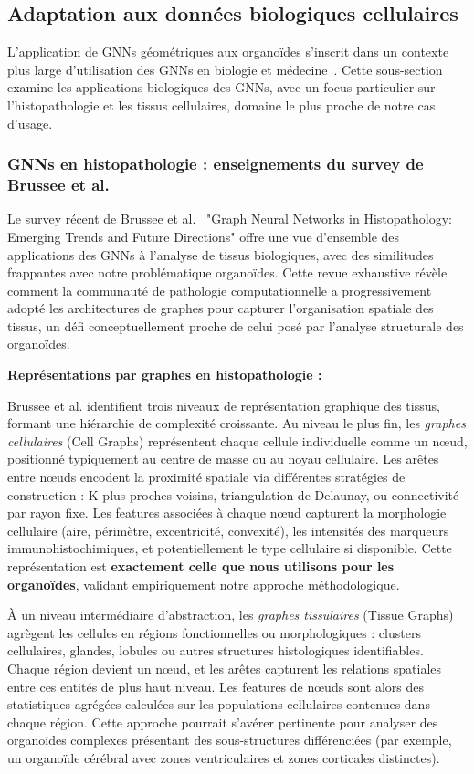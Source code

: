 \subsection{Adaptation aux données biologiques cellulaires}

L'application de GNNs géométriques aux organoïdes s'inscrit dans un contexte plus large d'utilisation des GNNs en biologie et médecine~\cite{Zhang2021GNN,Lecca2023}. Cette sous-section examine les applications biologiques des GNNs, avec un focus particulier sur l'histopathologie et les tissus cellulaires, domaine le plus proche de notre cas d'usage.

\subsubsection{GNNs en histopathologie : enseignements du survey de Brussee et al.}

Le survey récent de Brussee et al.~\cite{Brussee2024} "Graph Neural Networks in Histopathology: Emerging Trends and Future Directions" offre une vue d'ensemble des applications des GNNs à l'analyse de tissus biologiques, avec des similitudes frappantes avec notre problématique organoïdes. Cette revue exhaustive révèle comment la communauté de pathologie computationnelle a progressivement adopté les architectures de graphes pour capturer l'organisation spatiale des tissus, un défi conceptuellement proche de celui posé par l'analyse structurale des organoïdes.

\textbf{Représentations par graphes en histopathologie :}

Brussee et al. identifient trois niveaux de représentation graphique des tissus, formant une hiérarchie de complexité croissante. Au niveau le plus fin, les \textit{graphes cellulaires} (Cell Graphs) représentent chaque cellule individuelle comme un nœud, positionné typiquement au centre de masse ou au noyau cellulaire. Les arêtes entre nœuds encodent la proximité spatiale via différentes stratégies de construction : K plus proches voisins, triangulation de Delaunay, ou connectivité par rayon fixe. Les features associées à chaque nœud capturent la morphologie cellulaire (aire, périmètre, excentricité, convexité), les intensités des marqueurs immunohistochimiques, et potentiellement le type cellulaire si disponible. Cette représentation est \textbf{exactement celle que nous utilisons pour les organoïdes}, validant empiriquement notre approche méthodologique.

À un niveau intermédiaire d'abstraction, les \textit{graphes tissulaires} (Tissue Graphs) agrègent les cellules en régions fonctionnelles ou morphologiques : clusters cellulaires, glandes, lobules ou autres structures histologiques identifiables. Chaque région devient un nœud, et les arêtes capturent les relations spatiales entre ces entités de plus haut niveau. Les features de nœuds sont alors des statistiques agrégées calculées sur les populations cellulaires contenues dans chaque région. Cette approche pourrait s'avérer pertinente pour analyser des organoïdes complexes présentant des sous-structures différenciées (par exemple, un organoïde cérébral avec zones ventriculaires et zones corticales distinctes).


